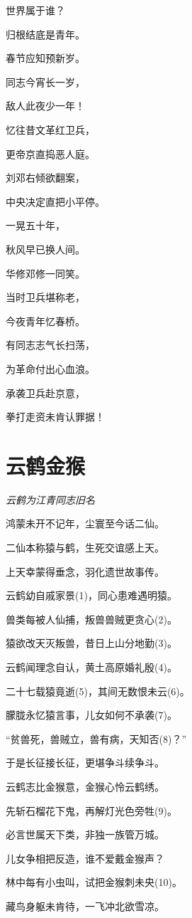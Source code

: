 \documentclass[
]{article}
\begin{document}
世界属于谁？

归根结底是青年。

春节应知预新岁。

同志今宵长一岁，

敌人此夜少一年！

忆往昔文革红卫兵，

更帝京直捣恶人庭。

刘邓右倾欲翻案，

中央决定直把小平停。

一晃五十年，

秋风早已换人间。

华修邓修一同笑。

当时卫兵堪称老，

今夜青年忆春桥。

有同志志气长扫荡，

为革命付出心血浪。

承袭卫兵赴京意，

拳打走资未肯认罪据！

\section{云鹤金猴}\label{ux4e91ux9e64ux91d1ux7334}

\emph{云鹤为江青同志旧名}

鸿蒙未开不记年，尘寰至今话二仙。

二仙本称猿与鹤，生死交谊感上天。

上天幸蒙得垂念，羽化遗世故事传。

云鹤幼自戚家景(1)，同心患难遇明猿。

兽类每被人仙捕，叛兽兽贼更贪心(2)。

猿欲改天灭叛兽，昔日上山分地勤(3)。

云鹤闻理念自认，黄土高原婚礼殷(4)。

二十七载猿竟逝(5)，其间无数恨未云(6)。

朦胧永忆猿言事，儿女如何不承袭(7)。

``贫兽死，兽贼立，兽有病，天知否(8)？''

于是长征接长征，更堪争斗续争斗。

云鹤志比金猴意，金猴心怜云鹤绣。

先斩石榴花下鬼，再解灯光色旁牲(9)。

必言世属天下类，非独一族管万城。

儿女争相把反造，谁不爱戴金猴声？

林中每有小虫叫，试把金猴刺未央(10)。

藏鸟身躯未肯待，一飞冲北欲雪凉。
\end{document}
